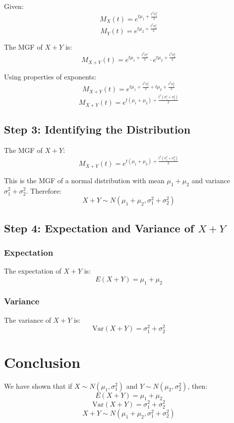 \documentclass[12pt]{article}
\begin{document}
Given:
\[ M_X(t) = e^{t\mu_1 + \frac{t^2\sigma_1^2}{2}} \]
\[ M_Y(t) = e^{t\mu_2 + \frac{t^2\sigma_2^2}{2}} \]

The MGF of \( X + Y \) is:
\[ M_{X+Y}(t) = e^{t\mu_1 + \frac{t^2\sigma_1^2}{2}} \cdot e^{t\mu_2 + \frac{t^2\sigma_2^2}{2}} \]

Using properties of exponents:
\[ M_{X+Y}(t) = e^{t\mu_1 + \frac{t^2\sigma_1^2}{2} + t\mu_2 + \frac{t^2\sigma_2^2}{2}} \]
\[ M_{X+Y}(t) = e^{t(\mu_1 + \mu_2) + \frac{t^2(\sigma_1^2 + \sigma_2^2)}{2}} \]

\subsection*{Step 3: Identifying the Distribution}
The MGF of \( X + Y \):
\[ M_{X+Y}(t) = e^{t(\mu_1 + \mu_2) + \frac{t^2(\sigma_1^2 + \sigma_2^2)}{2}} \]

This is the MGF of a normal distribution with mean \( \mu_1 + \mu_2 \) and variance \( \sigma_1^2 + \sigma_2^2 \). Therefore:
\[ X + Y \sim N(\mu_1 + \mu_2, \sigma_1^2 + \sigma_2^2) \]

\subsection*{Step 4: Expectation and Variance of \( X + Y \)}
\subsubsection*{Expectation}
The expectation of \( X + Y \) is:
\[ E(X + Y) = \mu_1 + \mu_2 \]

\subsubsection*{Variance}
The variance of \( X + Y \) is:
\[ \text{Var}(X + Y) = \sigma_1^2 + \sigma_2^2 \]

\section*{Conclusion}
We have shown that if \( X \sim N(\mu_1, \sigma_1^2) \) and \( Y \sim N(\mu_2, \sigma_2^2) \), then:
\[ E(X + Y) = \mu_1 + \mu_2 \]
\[ \text{Var}(X + Y) = \sigma_1^2 + \sigma_2^2 \]
\[ X + Y \sim N(\mu_1 + \mu_2, \sigma_1^2 + \sigma_2^2) \]
\end{document}
